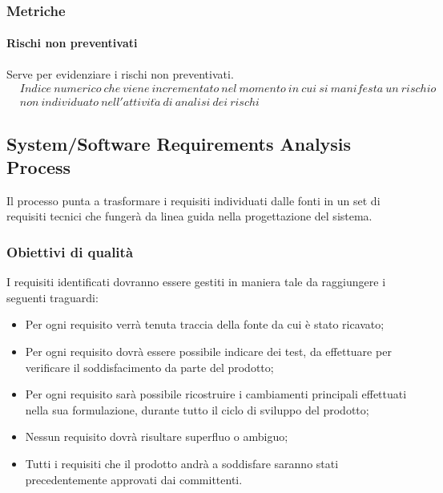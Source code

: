 \documentclass[../PianoDiQualifica.tex]{subfiles}
\begin{document}
			\subsubsection{Metriche}
				\paragraph{Rischi non preventivati}
				Serve per evidenziare i rischi non preventivati.
				\begin{equation*}
				\begin{split}
					&Indice \ numerico \ che \ viene \ incrementato \ nel \ momento \ in \ cui \ si \ manifesta \ un \ rischio \\ 
					&non \ individuato \ nell'attivit\grave{a} \ di \ analisi \ dei \ rischi
				\end{split}
				\end{equation*}
								
			
		\subsection{System/Software Requirements Analysis Process}
		Il processo punta a trasformare i requisiti individuati dalle fonti in un set di requisiti tecnici che fungerà da linea guida nella progettazione del sistema.
			
			\subsubsection{Obiettivi di qualità}
			I requisiti identificati dovranno essere gestiti in maniera tale da raggiungere i seguenti traguardi:
			\begin{itemize}
				\item Per ogni requisito verrà tenuta traccia della fonte da cui è stato ricavato;
				\item Per ogni requisito dovrà essere possibile indicare dei test, da effettuare per verificare il soddisfacimento da parte del prodotto;
				\item Per ogni requisito sarà possibile ricostruire i cambiamenti principali effettuati nella sua formulazione, durante tutto il ciclo di sviluppo del prodotto;
				\item Nessun requisito dovrà risultare superfluo o ambiguo;
				\item Tutti i requisiti che il prodotto andrà a soddisfare saranno stati precedentemente approvati dai committenti.
			\end{itemize}
			
\end{document}
